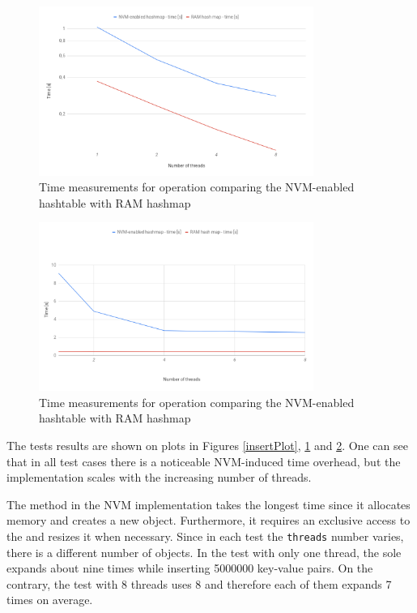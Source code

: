     \begin{figure}[ht]
        \centering
        \includegraphics[width=0.8\textwidth]{thesis/figures/get.png}
        \caption{Time measurements for \getMethod operation comparing the NVM-enabled hashtable with RAM hashmap}
        \label{getPlot}
    \end{figure}
    
    \begin{figure}[ht]
        \centering
        \includegraphics[width=0.8\textwidth]{thesis/figures/remove.png}
        \caption{Time measurements for \removeMethod operation comparing the NVM-enabled hashtable with RAM hashmap}
        \label{removePlot}
    \end{figure}
    
    The tests results are shown on plots in Figures \ref{insertPlot}, \ref{getPlot} and \ref{removePlot}. 
    One can see that in all test cases there is a noticeable NVM-induced time overhead, but the implementation scales with the increasing number of threads.
    
    The \insertMethod method in the NVM implementation takes the longest time since it allocates memory and creates a new object. 
    Furthermore, it requires an exclusive access to the \internalHashMap and resizes it when necessary. Since in each test the \texttt{threads} number varies, there is a different number of \internalHashMap objects.
    In the test with only one thread, the sole \internalHashMap expands about nine times while inserting 5000000 key-value pairs.
    On the contrary, the test with 8 threads uses 8 \internalHashMaps and therefore each of them expands 7 times on average. 
    
